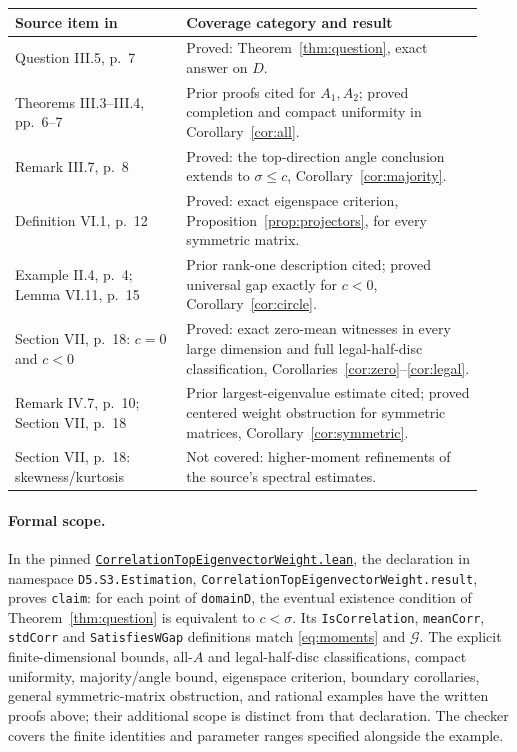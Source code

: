 \documentclass[11pt]{article}
\newcommand{\G}{\mathcal G}
\begin{document}
\begin{center}\small
\begin{tabular}{@{}>{\raggedright\arraybackslash}p{0.34\linewidth}>{\raggedright\arraybackslash}p{0.59\linewidth}@{}}
\toprule
Source item in \cite{SHG} & Coverage category and result \\
\midrule
Question III.5, p.~7 & Proved: Theorem~\ref{thm:question}, exact answer on $D$.\\
Theorems III.3--III.4, pp.~6--7 & Prior proofs cited for $A_1,A_2$;
proved completion and compact uniformity in Corollary~\ref{cor:all}.\\
Remark III.7, p.~8 & Proved: the top-direction angle conclusion extends
to $\sigma\le c$, Corollary~\ref{cor:majority}.\\
Definition VI.1, p.~12 & Proved: exact eigenspace criterion,
Proposition~\ref{prop:projectors}, for every symmetric matrix.\\
Example II.4, p.~4; Lemma VI.11, p.~15 & Prior rank-one description cited;
proved universal gap exactly for $c<0$, Corollary~\ref{cor:circle}.\\
Section VII, p.~18: $c=0$ and $c<0$ & Proved: exact zero-mean witnesses
in every large dimension and full legal-half-disc classification,
Corollaries~\ref{cor:zero}--\ref{cor:legal}.\\
Remark IV.7, p.~10; Section VII, p.~18 & Prior largest-eigenvalue estimate
cited; proved centered weight obstruction for symmetric matrices,
Corollary~\ref{cor:symmetric}.\\
Section VII, p.~18: skewness/kurtosis & Not covered: higher-moment
refinements of the source's spectral estimates.\\
\bottomrule
\end{tabular}
\end{center}

\begingroup\raggedright
\paragraph{Formal scope.}
In the pinned
\href{https://github.com/the-omega-institute/trureturing/blob/8c3421e2977f07cb0b5d9b30b7ede138d9951cb5/D5/S3/Estimation/CorrelationTopEigenvectorWeight.lean}{\texttt{CorrelationTopEigenvectorWeight.lean}},
the declaration in namespace \texttt{D5.S3.Estimation},
\texttt{CorrelationTopEigenvectorWeight.result},
proves \texttt{claim}: for each point of \texttt{domainD}, the eventual
existence condition of Theorem~\ref{thm:question} is equivalent to $c<\sigma$.
Its \texttt{IsCorrelation}, \texttt{meanCorr}, \texttt{stdCorr} and
\texttt{SatisfiesWGap} definitions match \eqref{eq:moments} and $\G$.
The explicit finite-dimensional bounds, all-$A$ and legal-half-disc
classifications, compact uniformity, majority/angle bound, eigenspace
criterion, boundary corollaries, general symmetric-matrix obstruction,
and rational examples have the written proofs above; their additional
scope is distinct from that declaration. The checker covers the finite
identities and parameter ranges specified alongside the example.\par
\endgroup
\end{document}
